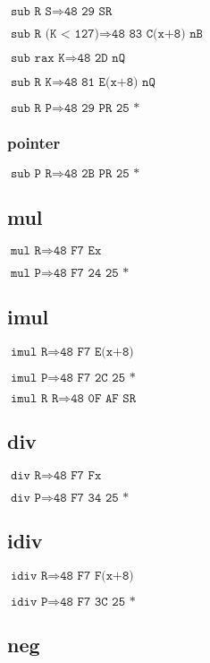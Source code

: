 \documentclass{article}
\begin{document}
$\texttt{sub R S} \Rightarrow \texttt{48 29 SR}$

$\texttt{sub R (K < 127)} \Rightarrow \texttt{48 83 C(x+8) nB}$

$\texttt{sub rax K} \Rightarrow \texttt{48 2D nQ}$

$\texttt{sub R K} \Rightarrow \texttt{48 81 E(x+8) nQ}$

$\texttt{sub R P} \Rightarrow \texttt{48 29 PR 25 *}$


\subsubsection{pointer}

$\texttt{sub P R} \Rightarrow \texttt{48 2B PR 25 *}$


\subsection{mul}

$\texttt{mul R} \Rightarrow \texttt{48 F7 Ex}$

$\texttt{mul P} \Rightarrow \texttt{48 F7 24 25 *}$


\subsection{imul}

$\texttt{imul R} \Rightarrow \texttt{48 F7 E(x+8)}$

$\texttt{imul P} \Rightarrow \texttt{48 F7 2C 25 *}$

$\texttt{imul R R} \Rightarrow \texttt{48 0F AF SR}$


\subsection{div}

$\texttt{div R} \Rightarrow \texttt{48 F7 Fx}$

$\texttt{div P} \Rightarrow \texttt{48 F7 34 25 *}$


\subsection{idiv}

$\texttt{idiv R} \Rightarrow \texttt{48 F7 F(x+8)}$

$\texttt{idiv P} \Rightarrow \texttt{48 F7 3C 25 *}$


\subsection{neg}
\end{document}
